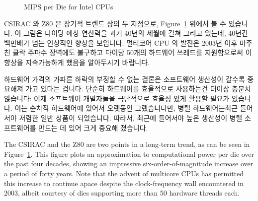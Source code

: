 \fi

\begin{figure}[tb]
\centering
{}
\caption{MIPS per Die for Intel CPUs}
\label{fig:intro:MIPS per Die for Intel CPUs}
\end{figure}

CSIRAC 와 Z80 은 장기적 트렌드 상의 두 지점으로,
Figure~\ref{fig:intro:MIPS per Die for Intel CPUs}
위에서 볼 수 있습니다.
이 그림은 다이당 예상 연산력을 과거 40년의 세월에 걸쳐 그리고 있는데, 40년간
백만배가 넘는 인상적인 향상을 보입니다.
멀티코어 CPU 의 발전은 2003년 이후 마주친 클락 주파수 장벽에도 불구하고 다이당
50개의 하드웨어 쓰레드를 지원함으로써 이 향상을 지속가능하게 했음을 알아두시기
바랍니다.

하드웨어 가격의 가파른 하락의 부정할 수 없는 결론은 소프트웨어 생산성이 갈수록
중요해져 가고 있다는 겁니다.
단순히 하드웨어를 효율적으로 사용하는건 더이상 충분치 않습니다:
이제 소프트웨어 개발자들을 극단적으로 효율성 있게 활용할 필요가 있습니다.
이는 순차적 하드웨어에 있어서 오랫동안 그랬습니다만, 병렬 하드웨어는최근
들어서야 저렴한 일반 상품이 되었습니다.
따라서, 최근에 들어서야 높은 생산성이 병렬 소프트웨어를 만드는 데 있어 크게
중요해 졌습니다.

\iffalse

The CSIRAC and the Z80 are two points in a long-term trend, as can be
seen in
Figure~\ref{fig:intro:MIPS per Die for Intel CPUs}.
This figure plots an approximation to computational power per die
over the past four decades, showing an impressive six-order-of-magnitude
increase over a period of forty years.
Note that the advent of multicore CPUs has permitted this increase to
continue apace despite the clock-frequency wall encountered in 2003,
albeit courtesy of dies supporting more than 50 hardware threads each.

